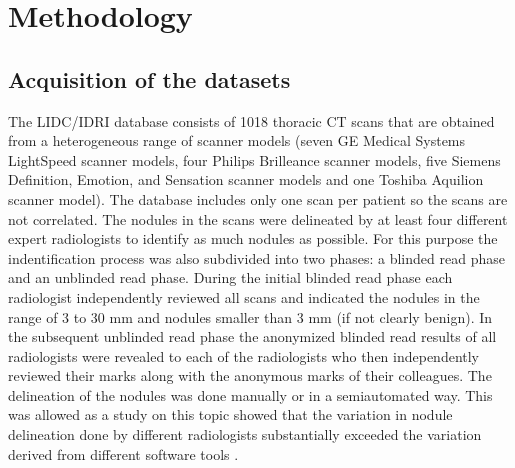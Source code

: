 \section{Methodology}
\subsection{Acquisition of the datasets}
The LIDC/IDRI database consists of 1018 thoracic CT scans that are obtained from
a heterogeneous range of scanner models (seven GE Medical Systems LightSpeed
scanner models, four Philips Brilleance scanner models, five Siemens Definition,
Emotion, and Sensation scanner models and one Toshiba Aquilion scanner model).
The database includes only one scan per patient so the scans are not correlated.
The nodules in the scans were delineated by at least four different expert
radiologists to identify as much nodules as possible. For this purpose the
indentification process was also subdivided into two phases: a blinded read
phase and an unblinded read phase. During the initial blinded read phase each
radiologist independently reviewed all scans and indicated the nodules in the
range of 3 to 30 mm and nodules smaller than 3 mm (if not clearly benign).
In the subsequent unblinded read phase the anonymized blinded read results of
all radiologists were revealed to each of the radiologists who then
independently reviewed their marks along with the anonymous marks of their
colleagues. The delineation of the nodules was done manually or in a
semiautomated way. This was allowed as a study on this topic showed that the
variation in nodule delineation done by different radiologists substantially
exceeded the variation derived from different software tools \cite{lidcbase}.

